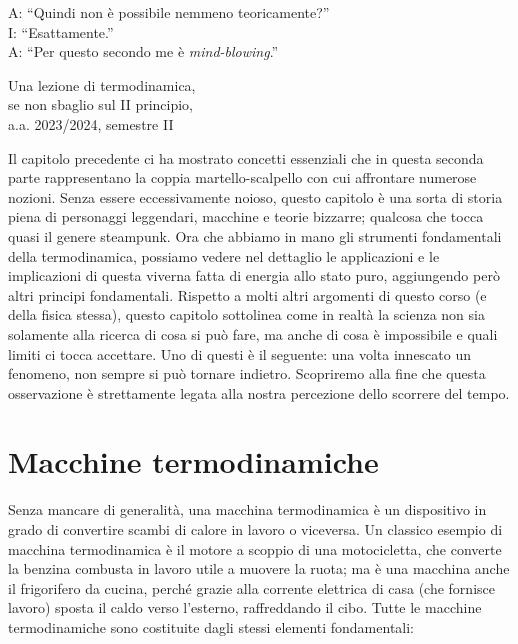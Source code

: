 \marginpar{\minitoc}

\epigraph{A: ``Quindi non è possibile nemmeno teoricamente?''\\I: ``Esattamente.''\\A: ``Per questo secondo me è \emph{mind-blowing}.''}{Una lezione di termodinamica,\\se non sbaglio sul II principio,\\a.a. 2023/2024, semestre II}

Il capitolo precedente ci ha mostrato concetti essenziali
che in questa seconda parte rappresentano la coppia martello-scalpello
con cui affrontare numerose nozioni.
Senza essere eccessivamente noioso, questo capitolo è una
sorta di storia piena di personaggi
leggendari, macchine e teorie bizzarre; qualcosa che tocca
quasi il genere steampunk. Ora che abbiamo in mano gli strumenti
fondamentali della termodinamica, possiamo vedere nel
dettaglio le applicazioni e le implicazioni di questa viverna
fatta di energia allo stato puro, aggiungendo però altri
principi fondamentali. Rispetto a molti altri
argomenti di questo corso (e della fisica stessa), questo
capitolo sottolinea come in realtà la scienza non sia
solamente alla ricerca di cosa si può fare, ma anche di
cosa è impossibile e quali limiti ci tocca accettare. Uno
di questi è il seguente: una
volta innescato un fenomeno, non sempre si può tornare indietro.
Scopriremo alla fine che questa osservazione è strettamente
legata alla nostra percezione dello scorrere del tempo.

\section{Macchine termodinamiche}
Senza mancare di generalità, una macchina termodinamica
è un dispositivo in grado di convertire scambi di calore
in lavoro o viceversa. Un classico esempio di macchina
termodinamica è il motore a scoppio di una motocicletta,
che converte la benzina combusta in lavoro utile a
muovere la ruota; ma è una macchina anche il frigorifero
da cucina, perché grazie alla corrente elettrica di
casa (che fornisce lavoro) sposta il caldo verso
l'esterno, raffreddando il cibo. Tutte le macchine
termodinamiche sono costituite dagli stessi elementi
fondamentali:

